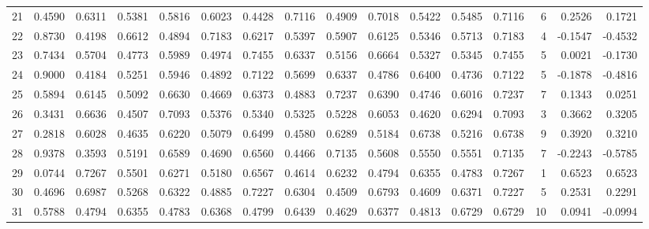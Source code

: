 \begin{tabular}{lrrrrrrrrrrrrrrr}
21  &      0.4590 &  0.6311 &  0.5381 &  0.5816 &  0.6023 &  0.4428 &  0.7116 &  0.4909 &  0.7018 &  0.5422 &   0.5485 &     0.7116 &      6 &                    0.2526 &                     0.1721 \\
22  &      0.8730 &  0.4198 &  0.6612 &  0.4894 &  0.7183 &  0.6217 &  0.5397 &  0.5907 &  0.6125 &  0.5346 &   0.5713 &     0.7183 &      4 &                   -0.1547 &                    -0.4532 \\
23  &      0.7434 &  0.5704 &  0.4773 &  0.5989 &  0.4974 &  0.7455 &  0.6337 &  0.5156 &  0.6664 &  0.5327 &   0.5345 &     0.7455 &      5 &                    0.0021 &                    -0.1730 \\
24  &      0.9000 &  0.4184 &  0.5251 &  0.5946 &  0.4892 &  0.7122 &  0.5699 &  0.6337 &  0.4786 &  0.6400 &   0.4736 &     0.7122 &      5 &                   -0.1878 &                    -0.4816 \\
25  &      0.5894 &  0.6145 &  0.5092 &  0.6630 &  0.4669 &  0.6373 &  0.4883 &  0.7237 &  0.6390 &  0.4746 &   0.6016 &     0.7237 &      7 &                    0.1343 &                     0.0251 \\
26  &      0.3431 &  0.6636 &  0.4507 &  0.7093 &  0.5376 &  0.5340 &  0.5325 &  0.5228 &  0.6053 &  0.4620 &   0.6294 &     0.7093 &      3 &                    0.3662 &                     0.3205 \\
27  &      0.2818 &  0.6028 &  0.4635 &  0.6220 &  0.5079 &  0.6499 &  0.4580 &  0.6289 &  0.5184 &  0.6738 &   0.5216 &     0.6738 &      9 &                    0.3920 &                     0.3210 \\
28  &      0.9378 &  0.3593 &  0.5191 &  0.6589 &  0.4690 &  0.6560 &  0.4466 &  0.7135 &  0.5608 &  0.5550 &   0.5551 &     0.7135 &      7 &                   -0.2243 &                    -0.5785 \\
29  &      0.0744 &  0.7267 &  0.5501 &  0.6271 &  0.5180 &  0.6567 &  0.4614 &  0.6232 &  0.4794 &  0.6355 &   0.4783 &     0.7267 &      1 &                    0.6523 &                     0.6523 \\
30  &      0.4696 &  0.6987 &  0.5268 &  0.6322 &  0.4885 &  0.7227 &  0.6304 &  0.4509 &  0.6793 &  0.4609 &   0.6371 &     0.7227 &      5 &                    0.2531 &                     0.2291 \\
31  &      0.5788 &  0.4794 &  0.6355 &  0.4783 &  0.6368 &  0.4799 &  0.6439 &  0.4629 &  0.6377 &  0.4813 &   0.6729 &     0.6729 &     10 &                    0.0941 &                    -0.0994 \\

\end{tabular}
